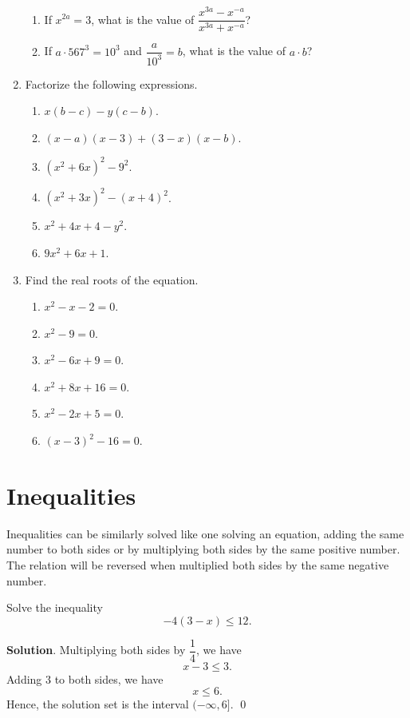 \documentclass[11pt]{book}
\theoremstyle{break}
\theoremstyle{no_label}
\numberwithin{equation}{section}
\begin{document}
\begin{enumerate}[label=\arabic*.]
\begin{enumerate}
        \item If $x^{2a}=3$, what is the value of $\dfrac{x^{3a}-x^{-a}}{x^{3a}+x^{-a}}$?
        \item If $a\cdot567^3=10^3$ and $\dfrac{a}{10^3}=b$, what is the value of $a\cdot b$?
    \end{enumerate}
    \item Factorize the following expressions.
    \begin{multicols}{2}
        \begin{enumerate}
            \item $x(b-c)-y(c-b)$.
            \item $(x-a)(x-3)+(3-x)(x-b)$.
            \item $(x^2+6x)^2-9^2$.
            \item $(x^2+3x)^2-(x+4)^2$.
            \item $x^2+4x+4-y^2$.
            \item $9x^2+6x+1$.
        \end{enumerate}
    \end{multicols}
    \item Find the real roots of the equation.
    \begin{multicols}{2}
        \begin{enumerate}
            \item $x^2-x-2=0$.
            \item $x^2-9=0$.
            \item $x^2-6x+9=0$.
            \item $x^2+8x+16=0$.
            \item $x^2-2x+5=0$.
            \item $(x-3)^2-16=0$.
        \end{enumerate}
    \end{multicols}
\end{enumerate}

\section{Inequalities}

Inequalities can be similarly solved like one solving an equation, adding the same number to both sides or by multiplying both sides by the same positive number. The relation will be reversed when multiplied both sides by the same negative number.

\begin{example}
    Solve the inequality $$-4(3-x)\leq 12.$$
\end{example}
\textbf{Solution}. Multiplying both sides by $\dfrac{1}{4}$, we have $$x-3\leq 3.$$ Adding $3$ to both sides, we have $$x\leq 6.$$ Hence, the solution set is the interval $(-\infty, 6]$. \qed
\end{document}
